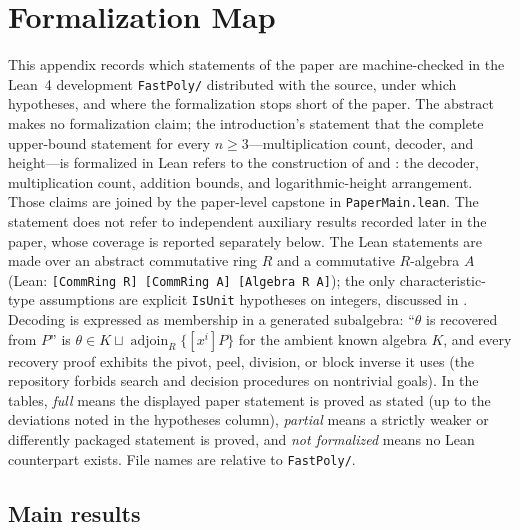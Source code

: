 \section{Formalization Map}
\label{appendix:formalization-map}

This appendix records which statements of the paper are machine-checked in
the Lean~4 development \texttt{FastPoly/\allowbreak } distributed with the source, under
which hypotheses, and where the formalization stops short of the paper.  The
abstract makes no formalization claim; the introduction's statement that the
complete upper-bound statement for every $n\ge3$---multiplication count,
decoder, and height---is formalized in Lean refers to the construction of
 and : the decoder,
multiplication count, addition bounds, and logarithmic-height arrangement.
Those claims are joined by the paper-level capstone in
\texttt{PaperMain.lean}.  The statement does not refer to independent
auxiliary results recorded later in the paper, whose coverage is reported
separately below.
The
Lean statements are made over an abstract commutative ring $R$ and a
commutative $R$-algebra $A$ (Lean: \texttt{[CommRing R] [CommRing A]
[Algebra R A]}); the only characteristic-type assumptions are explicit
\texttt{IsUnit} hypotheses on integers, discussed in
.  Decoding is expressed as membership in
a generated subalgebra: ``$\theta$ is recovered from $P$'' is
$\theta\in K\sqcup\operatorname{adjoin}_R\{[x^i]P\}$ for the ambient known
algebra $K$, and every recovery proof exhibits the pivot, peel, division, or
block inverse it uses (the repository forbids search and decision
procedures on nontrivial goals).  In the tables, \emph{full} means the
displayed paper statement is proved as stated (up to the deviations noted in
the hypotheses column), \emph{partial} means a strictly weaker or
differently packaged statement is proved, and \emph{not formalized} means
no Lean counterpart exists.  File names are relative to \texttt{FastPoly/\allowbreak }.

\subsection{Main results}
\label{sec:formalization-map:main}

